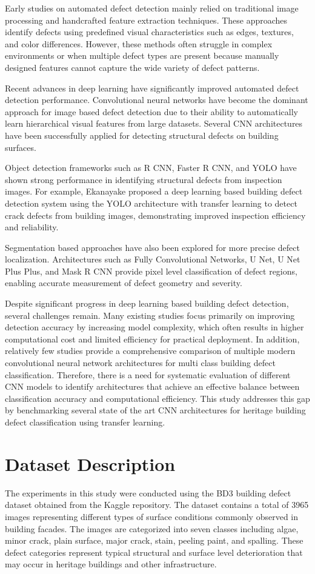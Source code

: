 \documentclass[conference]{IEEEtran}
\begin{document}
Early studies on automated defect detection mainly relied on traditional image processing and handcrafted feature extraction techniques. These approaches identify defects using predefined visual characteristics such as edges, textures, and color differences. However, these methods often struggle in complex environments or when multiple defect types are present because manually designed features cannot capture the wide variety of defect patterns.

Recent advances in deep learning have significantly improved automated defect detection performance. Convolutional neural networks have become the dominant approach for image based defect detection due to their ability to automatically learn hierarchical visual features from large datasets. Several CNN architectures have been successfully applied for detecting structural defects on building surfaces.

Object detection frameworks such as R CNN, Faster R CNN, and YOLO have shown strong performance in identifying structural defects from inspection images. For example, Ekanayake proposed a deep learning based building defect detection system using the YOLO architecture with transfer learning to detect crack defects from building images, demonstrating improved inspection efficiency and reliability.

Segmentation based approaches have also been explored for more precise defect localization. Architectures such as Fully Convolutional Networks, U Net, U Net Plus Plus, and Mask R CNN provide pixel level classification of defect regions, enabling accurate measurement of defect geometry and severity.

Despite significant progress in deep learning based building defect detection, several challenges remain. Many existing studies focus primarily on improving detection accuracy by increasing model complexity, which often results in higher computational cost and limited efficiency for practical deployment. In addition, relatively few studies provide a comprehensive comparison of multiple modern convolutional neural network architectures for multi class building defect classification. Therefore, there is a need for systematic evaluation of different CNN models to identify architectures that achieve an effective balance between classification accuracy and computational efficiency. This study addresses this gap by benchmarking several state of the art CNN architectures for heritage building defect classification using transfer learning.
\section{Dataset Description}
The experiments in this study were conducted using the BD3 building defect dataset obtained from the Kaggle repository. The dataset contains a total of 3965 images representing different types of surface conditions commonly observed in building facades. The images are categorized into seven classes including algae, minor crack, plain surface, major crack, stain, peeling paint, and spalling. These defect categories represent typical structural and surface level deterioration that may occur in heritage buildings and other infrastructure.
\end{document}
